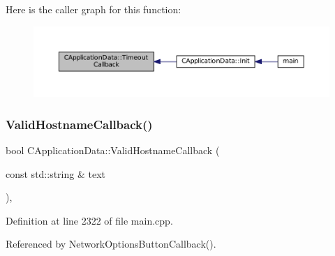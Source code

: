 Here is the caller graph for this function\+:\nopagebreak
\begin{figure}[H]
\begin{center}
\leavevmode
\includegraphics[width=350pt]{classCApplicationData_af66e15f6935f053b46a11aaa51a869c9_icgraph}
\end{center}
\end{figure}
\hypertarget{classCApplicationData_aad04c7da1cc86bef623efda1019907fd}{}\label{classCApplicationData_aad04c7da1cc86bef623efda1019907fd} 
\subsubsection{\texorpdfstring{Valid\+Hostname\+Callback()}{ValidHostnameCallback()}}
{\footnotesize\ttfamily bool C\+Application\+Data\+::\+Valid\+Hostname\+Callback (\begin{DoxyParamCaption}\item[{const std\+::string \&}]{text }\end{DoxyParamCaption})\hspace{0.3cm}{\ttfamily [static]}, {\ttfamily [protected]}}



Definition at line 2322 of file main.\+cpp.



Referenced by Network\+Options\+Button\+Callback().


